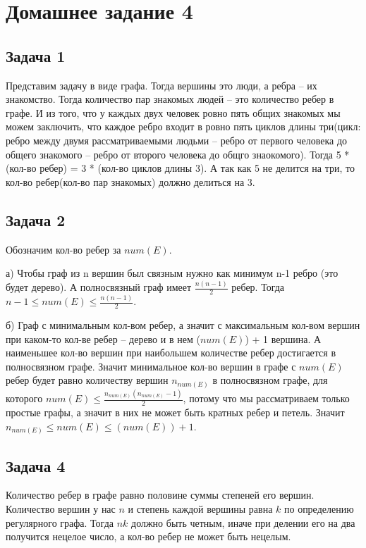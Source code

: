 

	\section{Домашнее задание 4} 
	\subsection{Задача 1}
	Представим задачу в виде графа. Тогда вершины это люди, а ребра -- их знакомство. Тогда количество пар знакомых людей -- это количество ребер в графе. И из того, что у каждых двух человек ровно пять общих знакомых мы можем заключить, что каждое ребро входит в ровно пять циклов длины три(цикл: ребро между двумя рассматриваемыми людьми -- ребро от первого человека до общего знакомого -- ребро от второго человека до общго знаокомого). 
	Тогда 5 * (кол-во ребер) = 3 * (кол-во циклов длины 3). А так как 5 не делится на три, то кол-во ребер(кол-во пар знакомых) должно делиться на 3.
	
	\subsection{Задача 2}
	Обозначим кол-во ребер за $num(E)$.
	
	а) Чтобы граф из n вершин был связным нужно как минимум n-1 ребро (это будет дерево). А полносвязный граф имеет $\frac{n(n-1)}{2}$ ребер. Тогда $n - 1 \le num(E) \le \frac{n(n-1)}{2}$.
	
	б) Граф с минимальным кол-вом ребер, а значит с максимальным кол-вом вершин при каком-то кол-ве ребер -- дерево и в нем ($num(E)$) + 1 вершина. 
	А наименьшее кол-во вершин при наибольшем количестве ребер достигается в полносвязном графе. Значит минимальное кол-во вершин в графе с $num(E)$ ребер будет равно количеству вершин $n_{num(E)}$ в полносвязном графе, для которого $num(E) \le \frac{n_{num(E)}(n_{num(E)}-1)}{2}$, потому что мы рассматриваем только простые графы, а значит в них не может быть кратных ребер и петель. 
	Значит $n_{num(E)} \le num(E) \le (num(E)) + 1$.
	
	\subsection{Задача 4}
	Количество ребер в графе равно половине суммы степеней его вершин. Количество вершин у нас $n$ и степень каждой вершины равна $k$ по определению регулярного графа. Тогда $nk$ должно быть четным, иначе при делении его на два получится нецелое число, а кол-во ребер не может быть нецелым.
	
